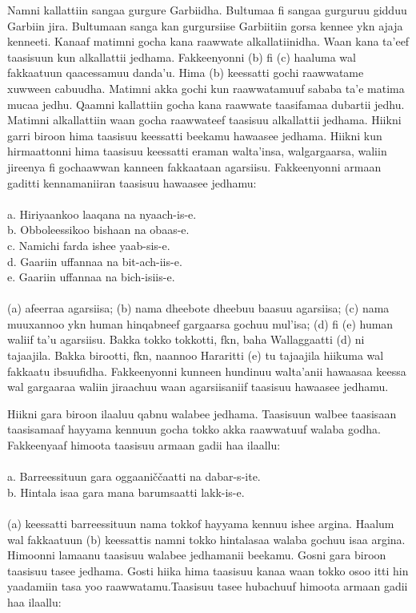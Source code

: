 \documentclass[11pt,b5paper]{book}
\begin{document}
Namni kallattiin sangaa gurgure Garbiidha. Bultumaa fi sangaa gurguruu gidduu Garbiin jira. Bultumaan sanga kan gurgursiise Garbiitiin gorsa kennee ykn ajaja kenneeti. Kanaaf matimni gocha kana raawwate alkallatiinidha. Waan kana ta’eef taasisuun kun alkallattii jedhama. Fakkeenyonni (b) fi (c)
haaluma wal fakkaatuun qaacessamuu danda’u. Hima (b) keessatti gochi raawwatame xuwween cabuudha. Matimni akka gochi kun raawwatamuuf sababa ta’e matima mucaa jedhu. Qaamni kallattiin gocha kana raawwate taasifamaa dubartii jedhu. Matimni alkallattiin waan gocha raawwateef taasisuu alkallattii jedhama. Hiikni garri biroon hima taasisuu keessatti beekamu hawaasee jedhama. Hiikni kun hirmaattonni hima taasisuu keessatti eraman walta’insa, walgargaarsa, waliin jireenya fi gochaawwan kanneen fakkaataan agarsiisu. Fakkeenyonni armaan gaditti kennamaniiran taasisuu hawaasee jedhamu: \\
\\
a. Hiriyaankoo laaqana na nyaach-is-e.\\
b. Obboleessikoo bishaan na obaas-e.\\
c. Namichi farda ishee yaab-sis-e.\\
d. Gaariin uffannaa na bit-ach-iis-e.\\
e. Gaariin uffannaa na bich-isiis-e.\\
\\

(a) afeerraa agarsiisa; (b) nama dheebote dheebuu baasuu agarsiisa; (c) nama muuxannoo ykn human hinqabneef gargaarsa gochuu mul’isa; (d) fi (e) human waliif ta’u agarsiisu. Bakka tokko tokkotti, fkn, baha Wallaggaatti (d) ni tajaajila. Bakka birootti, fkn, naannoo Hararitti (e) tu tajaajila hiikuma wal fakkaatu ibsuufidha. Fakkeenyonni kunneen hundinuu walta’anii hawaasaa keessa wal gargaaraa waliin jiraachuu waan agarsiisaniif taasisuu hawaasee jedhamu.

Hiikni gara biroon ilaaluu qabnu walabee jedhama. Taasisuun walbee taasisaan taasisamaaf hayyama kennuun gocha tokko akka raawwatuuf walaba godha. Fakkeenyaaf himoota taasisuu armaan gadii haa ilaallu:\\
\\

a. Barreessituun gara oggaaniččaatti na dabar-s-ite.\\
b. Hintala isaa gara mana barumsaatti lakk-is-e.\\
\\

(a) keessatti barreessituun nama tokkof hayyama kennuu ishee argina. Haalum wal fakkaatuun (b) keessattis namni tokko hintalasaa walaba gochuu isaa argina. Himoonni lamaanu taasisuu walabee jedhamanii beekamu. Gosni gara biroon taasisuu tasee jedhama. Gosti hiika hima taasisuu kanaa waan
tokko osoo itti hin yaadamiin tasa yoo raawwatamu.Taasisuu tasee hubachuuf himoota armaan gadii haa ilaallu:\\
\\
\end{document}
